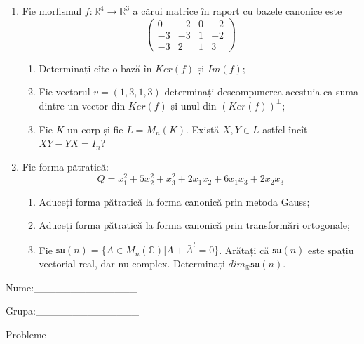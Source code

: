 \documentclass{article}
\begin{document}
\begin{enumerate}
 \item Fie morfismul $f:\mathbb{R}^4 \to \mathbb{R}^3$ a cărui matrice în raport cu bazele canonice este
$$\begin{pmatrix}
0&-2&0&-2\\
-3&-3&1&-2\\
-3&2&1&3
\end{pmatrix}$$

\begin{enumerate}
\item Determinați cîte o bază în $Ker(f)$ și $Im(f)$;
\item Fie vectorul $v=(1,3,1,3)$ determinați descompunerea acestuia ca suma dintre un vector din $Ker(f)$ și unul din $(Ker(f))^\perp$;
\item Fie $K$ un corp și fie $L=M_n(K)$. Există $X,Y \in L$ astfel încît $XY-YX=I_n$?  
\end{enumerate}
\item Fie forma pătratică:
$$Q= x_1^2+5x_2^2+x_3^2+2x_1x_2+6x_1x_3+2x_2x_3$$

\begin{enumerate}
\item Aduceți forma pătratică la forma canonică prin metoda Gauss;
\item Aduceți forma pătratică la forma canonică prin transformări ortogonale;
\item Fie $\mathfrak{su}(n)=\{ A \in M_n(\mathbb{C}) | A+\bar{A}^t=0\}$. Arătați că $\mathfrak{su}(n)$ este spațiu vectorial real, dar nu complex.
Determinați $dim_{\mathbb{R}}\mathfrak{su}(n)$.
\end{enumerate}
\end{enumerate}
\newpage
\begin{flushright}
Nume:\_\_\_\_\_\_\_\_\_\_\_\_\_\_
 
 
Grupa:\_\_\_\_\_\_\_\_\_\_\_\_\_\_
\end{flushright}
\begin{center}
\vspace{2cm}
{\Large Probleme}
\vspace{2cm}
\end{center}
\end{document}

